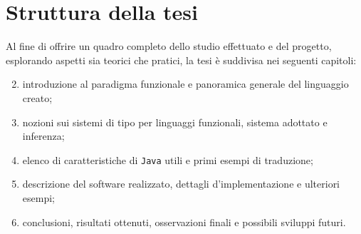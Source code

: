 \section{Struttura della tesi}
\label{sec:1-3-thesis-structure}

Al fine di offrire un quadro completo dello studio effettuato e del progetto,
esplorando aspetti sia teorici che pratici, la tesi è suddivisa nei seguenti capitoli:
\begin{enumerate}
    \setcounter{enumi}{1}
    \item introduzione al paradigma funzionale e panoramica generale del linguaggio creato;
    \item nozioni sui sistemi di tipo per linguaggi funzionali, sistema adottato e inferenza;
    \item elenco di caratteristiche di \texttt{Java} utili e primi esempi di traduzione;
    \item descrizione del software realizzato, dettagli d'implementazione e ulteriori esempi;
    \item conclusioni, risultati ottenuti, osservazioni finali e possibili sviluppi futuri.
\end{enumerate}